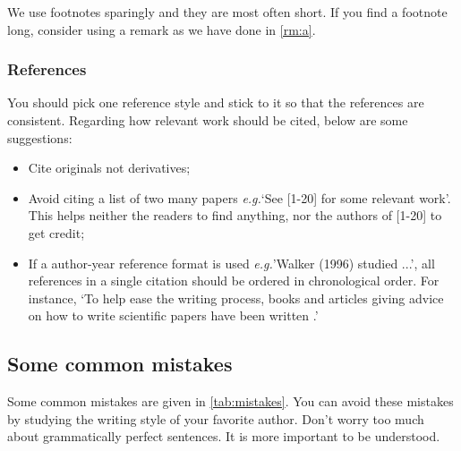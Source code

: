 \documentclass[authoryear,3p,times,preprint,review,fleqn]{elsarticle}
\newcommand{\eg}{\textit{e.g.}\xspace}
\numberwithin{equation}{section}
\theoremstyle{remark}
\begin{document}
We use footnotes sparingly and they are most often short. If you find a footnote long, consider using a remark as we have done in \cref{rm:a}.

\subsubsection{References}\label{sec:references}

You should pick one reference style and stick to it so that the references are consistent. Regarding how relevant work should be cited, below are some suggestions:

\begin{itemize}
\item Cite originals not derivatives;
\item Avoid citing a list of two many papers \eg `See [1-20] for some relevant work'. This helps neither the readers to find anything, nor the authors of [1-20] to get credit;
\item If a author-year reference format is used \eg 'Walker (1996) studied ...', all references in a single citation should be ordered in chronological order. For instance, `To help ease the writing process, books and articles giving advice on how to write scientific papers have been written \citep{day1998write,ashby2000write,plaxco2010art}.'
\end{itemize}

% 
\subsection{Some common mistakes}\label{sec:mistakes}


Some common mistakes are given in \cref{tab:mistakes}. You can avoid these mistakes by studying the writing style of your favorite author. Don't worry too much about grammatically perfect sentences. It is more important to be understood. \\
\end{document}
